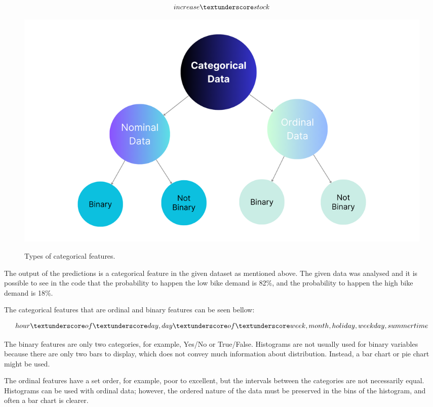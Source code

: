 \documentclass{article}
\begin{document}
\begin{enumerate}
\begin{equation}
increase \textunderscore stock
\label{eq:2}
\end{equation}

\begin{figure}[H]
		\centering
		\caption{Types of categorical features.}
		\includegraphics[width=0.7\linewidth]{Report/Images/CategoricalData.png}
	\label{fig:categorical}
	\end{figure}



 The output of the predictions is a categorical feature in the given dataset as mentioned above. The given data was analysed and it is possible to see in the code that the probability to happen the low \textunderscore bike \textunderscore demand is 82\%, and the probability to happen the high \textunderscore bike \textunderscore demand is 18\%.


 

The categorical features that are ordinal and binary features can be seen bellow:

\begin{equation}
hour \textunderscore of \textunderscore day, day \textunderscore of \textunderscore week, month, holiday, weekday, summertime
\label{eq:3}
\end{equation}

The binary features are only two categories, for example, Yes/No or True/False. Histograms are not usually used for binary variables because there are only two bars to display, which does not convey much information about distribution. Instead, a bar chart or pie chart might be used.

The ordinal features have a set order, for example, poor to excellent, but the intervals between the categories are not necessarily equal. Histograms can be used with ordinal data; however, the ordered nature of the data must be preserved in the bins of the histogram, and often a bar chart is clearer.


\end{enumerate}
\end{document}
